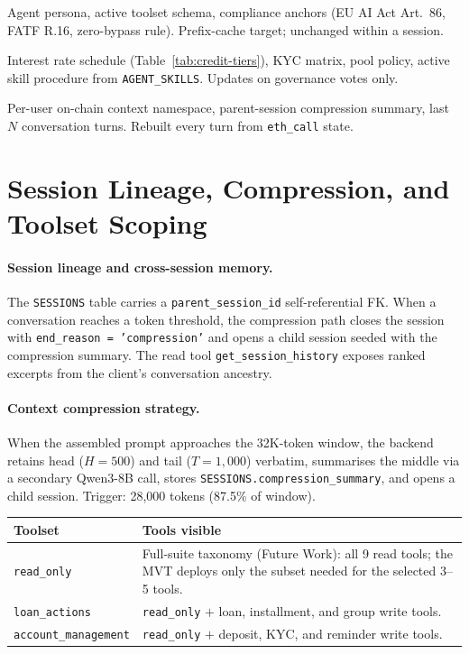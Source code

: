 \documentclass[12pt,a4paper]{report}
\newcommand{\tableheadcolor}{\rowcolor{TableHeadBg}}
\begin{document}
\begin{description}[noitemsep,leftmargin=0pt]
\item[\textbf{Stable tier.}] Agent persona, active toolset schema, compliance anchors (EU AI Act Art.~86, FATF R.16, zero-bypass rule). Prefix-cache target; unchanged within a session.
\item[\textbf{Context tier.}] Interest rate schedule (Table~\ref{tab:credit-tiers}), KYC matrix, pool policy, active skill procedure from \texttt{AGENT\_SKILLS}. Updates on governance votes only.
\item[\textbf{Volatile tier.}] Per-user on-chain context namespace, parent-session compression summary, last $N$ conversation turns. Rebuilt every turn from \texttt{eth\_call} state.
\end{description}

\section{Session Lineage, Compression, and Toolset Scoping}

\paragraph{Session lineage and cross-session memory.}
The \texttt{SESSIONS} table carries a \texttt{parent\_session\_id} self-referential FK. When a conversation reaches a token threshold, the compression path closes the session with \texttt{end\_reason = 'compression'} and opens a child session seeded with the compression summary. The read tool \texttt{get\_session\_history} exposes ranked excerpts from the client's conversation ancestry.

\paragraph{Context compression strategy.}
When the assembled prompt approaches the 32K-token window, the backend retains head ($H{=}500$) and tail ($T{=}1{,}000$) verbatim, summarises the middle via a secondary Qwen3-8B call, stores \texttt{SESSIONS.compression\_summary}, and opens a child session. Trigger: 28{,}000 tokens (87.5\% of window).

\begin{table}[H]
\centering
\begin{tabular}{p{3.5cm}p{9cm}}
\toprule
\tableheadcolor
\textbf{Toolset} & \textbf{Tools visible} \\
\midrule
\texttt{read\_only} & Full-suite taxonomy (Future Work): all 9 read tools; the MVT deploys only the subset needed for the selected 3--5 tools. \\
\texttt{loan\_actions} & \texttt{read\_only} $+$ loan, installment, and group write tools. \\
\texttt{account\_management} & \texttt{read\_only} $+$ deposit, KYC, and reminder write tools. \\
\bottomrule
\end{tabular}
\end{table}
\end{document}
